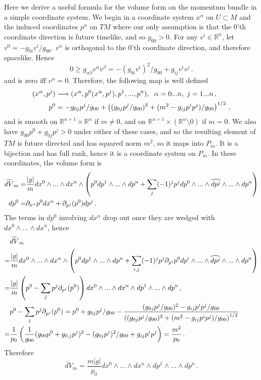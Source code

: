 \label{coordComp}
Here we derive a useful formula for the volume form on the momentum bundle in a simple coordinate system.  We begin in a coordinate system $x^\alpha$ on $U\subset M$ and the induced coordinates $p^\alpha$ on $TM$ where our only assumption is that the $0$'th coordinate direction is future timelike, and so $g_{00}>0$.  For any $v^i\in \mathbb{R}^n$, let $v^0=-g_{0i}v^i/g_{00}$.  $v^\alpha$ is orthogonal to the $0$'th coordinate direction, and therefore spacelike. Hence 
\begin{equation}
0\geq g_{\alpha \beta}v^\alpha v^\beta=-(g_{0i}v^i)^2/g_{00}+g_{ij}v^iv^j\,.
\end{equation}
and is zero iff $v^\alpha=0$. Therefore, the following map is well defined
\begin{align}
(x^\alpha,p^j)&\longrightarrow (x^\alpha,p^0(x^\alpha,p^j),p^1,...,p^n),  \hspace{2mm} \alpha=0...n, \hspace{1mm} j=1...n \,,\notag\\
 p^0&=-g_{0j}p^j/g_{00}+\left((g_{0j}p^j/g_{00})^2+(m^2-g_{ij}p^ip^j)/g_{00}\right)^{1/2}\,,
\end{align}
and is smooth on $\mathbb{R}^{n+1}\times\mathbb{R}^n$ if $m\neq 0$, and on $\mathbb{R}^{n+1}\times\left(\mathbb{R}^n\setminus{0}\right)$ if $m=0$.  We also have $g_{00}p^0+g_{0j}p^j>0$ under either of these cases, and so the resulting element of $TM$ is future directed and has squared norm $m^2$, so it maps into $P_m$.  It is a bijection and has full rank, hence it is a coordinate system on $P_m$.  In these coordinates, the volume form is
\begin{align}
\widetilde{dV}_m=&\frac{|g|}{m}dx^0\wedge...\wedge dx^n\wedge\left(p^0dp^1\wedge...\wedge dp^n+\sum_j (-1)^j p^j dp^0\wedge...\wedge\widehat{dp^j}\wedge...\wedge dp^n\right)\notag\\
dp^0=&\partial_{x^\alpha} p^0dx^\alpha+\partial_{p^j}(p^0) dp^j\,.
\end{align}
The terms in $dp^0$ involving $dx^\alpha$ drop out once they are wedged with $dx^0\wedge...\wedge dx^n$, hence
\begin{align}
&\widetilde{dV}_m\\
=&\frac{|g|}{m}dx^0\wedge...\wedge dx^n\wedge\left(p^0dp^1\wedge...\wedge dp^n+\sum_{i,j} (-1)^j p^j \partial_{p^i}p^0 dp^i\wedge...\wedge\widehat{dp^j}\wedge...\wedge dp^n\right)\notag\\
=&\frac{|g|}{m}\left(p^0-\sum_{j}p^j \partial_{p^j}(p^0) \right)dx^0\wedge...\wedge dx^n\wedge dp^1\wedge...\wedge dp^n\,,\notag\\
&p^0-\sum_jp^j\partial_{p^j}(p^0)= p^0+g_{0j}p^j/g_{00}-\frac{(g_{0j}p^j/g_{00})^2-g_{ij}p^ip^j/g_{00}}{\left((g_{0j}p^j/g_{00})^2+(m^2-g_{ij}p^ip^j)/g_{00}\right)^{1/2}}\notag\\
=&\frac{1}{p_0}\left(\frac{1}{g_{00}}(g_{00}p^0+g_{0,j}p^j)^2-(g_{0j}p^j)^2/g_{00}+g_{ij}p^ip^j\right)=\frac{m^2}{p_0}\,.\notag
\end{align}
Therefore
\begin{equation}
\widetilde{dV}_m=\frac{m|g|}{p_0}dx^0\wedge...\wedge dx^n\wedge dp^1\wedge...\wedge dp^n\,.
\end{equation}

